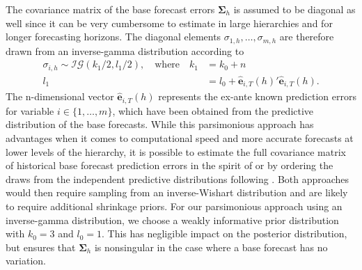\documentclass[a4paper,fleqn,11pt]{article}
\begin{document}
The covariance matrix of the base forecast errors $\boldsymbol{\Sigma}_h$ is assumed to be diagonal as well since it can be very cumbersome to estimate in large hierarchies and for longer forecasting horizons. The diagonal elements $\sigma_{1,h}, \hdots, \sigma_{m,h}$ are therefore drawn from an inverse-gamma distribution according to
\begin{align*}
	\sigma_{i,h} \sim \mathcal{IG}(k_1/2,l_1/2), \quad \text{where} \quad k_1 &= k_0 + n\\
	l_1 &= l_0 + \mathbf{\hat{e}}_{i,T}(h)'\mathbf{\hat{e}}_{i,T}(h).
\end{align*}
The n-dimensional vector $\mathbf{\hat{e}}_{i,T}(h)$ represents the ex-ante known prediction errors for variable $i \in \{1, \hdots, m\}$, which have been obtained from the predictive distribution of the base forecasts. While this parsimonious approach has advantages when it comes to computational speed and more accurate forecasts at lower levels of the hierarchy, it is possible to estimate the full covariance matrix of historical base forecast prediction errors in the spirit of \cite{Wickramasuriya2015} or by ordering the draws from the independent predictive distributions following \cite{Jeon2019}. Both approaches would then require sampling from an inverse-Wishart distribution and are likely to require additional shrinkage priors. For our parsimonious approach using an inverse-gamma distribution, we choose a weakly informative prior distribution with $k_0 = 3$ and $l_0 = 1$. This has negligible impact on the posterior
distribution, but ensures that $\boldsymbol{\Sigma}_h$ is nonsingular in the case where a base forecast has no
variation.
\end{document}
